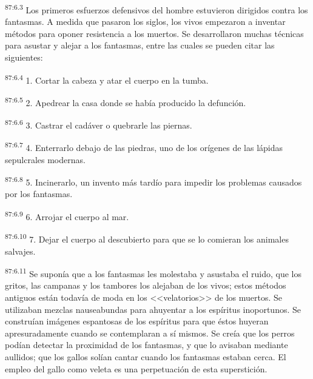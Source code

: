 \par
\textsuperscript{87:6.3} Los primeros esfuerzos defensivos del hombre estuvieron dirigidos contra los fantasmas. A medida que pasaron los siglos, los vivos empezaron a inventar métodos para oponer resistencia a los muertos. Se desarrollaron muchas técnicas para asustar y alejar a los fantasmas, entre las cuales se pueden citar las siguientes:

\par
\textsuperscript{87:6.4} 1. Cortar la cabeza y atar el cuerpo en la tumba.

\par
\textsuperscript{87:6.5} 2. Apedrear la casa donde se había producido la defunción.

\par
\textsuperscript{87:6.6} 3. Castrar el cadáver o quebrarle las piernas.

\par
\textsuperscript{87:6.7} 4. Enterrarlo debajo de las piedras, uno de los orígenes de las lápidas sepulcrales modernas.

\par
\textsuperscript{87:6.8} 5. Incinerarlo, un invento más tardío para impedir los problemas causados por los fantasmas.

\par
\textsuperscript{87:6.9} 6. Arrojar el cuerpo al mar.

\par
\textsuperscript{87:6.10} 7. Dejar el cuerpo al descubierto para que se lo comieran los animales salvajes.

\par
\textsuperscript{87:6.11} Se suponía que a los fantasmas les molestaba y asustaba el ruido, que los gritos, las campanas y los tambores los alejaban de los vivos; estos métodos antiguos están todavía de moda en los <<velatorios>> de los muertos. Se utilizaban mezclas nauseabundas para ahuyentar a los espíritus inoportunos. Se construían imágenes espantosas de los espíritus para que éstos huyeran apresuradamente cuando se contemplaran a sí mismos. Se creía que los perros podían detectar la proximidad de los fantasmas, y que lo avisaban mediante aullidos; que los gallos solían cantar cuando los fantasmas estaban cerca. El empleo del gallo como veleta es una perpetuación de esta superstición.

